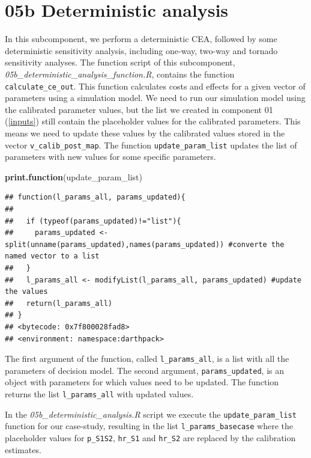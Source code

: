 \documentclass[]{book}
\newenvironment{Shaded}{\begin{snugshade}}{\end{snugshade}}
\newcommand{\KeywordTok}[1]{\textcolor[rgb]{0.13,0.29,0.53}{\textbf{#1}}}
\newcommand{\NormalTok}[1]{#1}
\begin{document}
\section{05b Deterministic analysis}\label{Deterministic-analysis}

In this subcomponent, we perform a deterministic CEA, followed by some
deterministic sensitivity analysis, including one-way, two-way and
tornado sensitivity analyses. The function script of this subcomponent,
\emph{05b\_deterministic\_analysis\_function.R}, contains the function
\texttt{calculate\_ce\_out}. This function calculates costs and effects
for a given vector of parameters using a simulation model. We need to
run our simulation model using the calibrated parameter values, but the
list we created in component 01 (\ref{inputs}) still contain the
placeholder values for the calibrated parameters. This means we need to
update these values by the calibrated values stored in the vector
\texttt{v\_calib\_post\_map}. The function \texttt{update\_param\_list}
updates the list of parameters with new values for some specific
parameters.

\begin{Shaded}
\begin{Highlighting}[]
\KeywordTok{print.function}\NormalTok{(update_param_list)}
\end{Highlighting}
\end{Shaded}

\begin{verbatim}
## function(l_params_all, params_updated){
##   
##   if (typeof(params_updated)!="list"){
##     params_updated <- split(unname(params_updated),names(params_updated)) #converte the named vector to a list
##   }
##   l_params_all <- modifyList(l_params_all, params_updated) #update the values
##   return(l_params_all)
## }
## <bytecode: 0x7f800028fad8>
## <environment: namespace:darthpack>
\end{verbatim}

The first argument of the function, called \texttt{l\_params\_all}, is a
list with all the parameters of decision model. The second argument,
\texttt{params\_updated}, is an object with parameters for which values
need to be updated. The function returns the list
\texttt{l\_params\_all} with updated values.

In the \emph{05b\_deterministic\_analysis.R} script we execute the
\texttt{update\_param\_list} function for our case-study, resulting in
the list \texttt{l\_params\_basecase} where the placeholder values for
\texttt{p\_S1S2}, \texttt{hr\_S1} and \texttt{hr\_S2} are replaced by
the calibration estimates.
\end{document}
